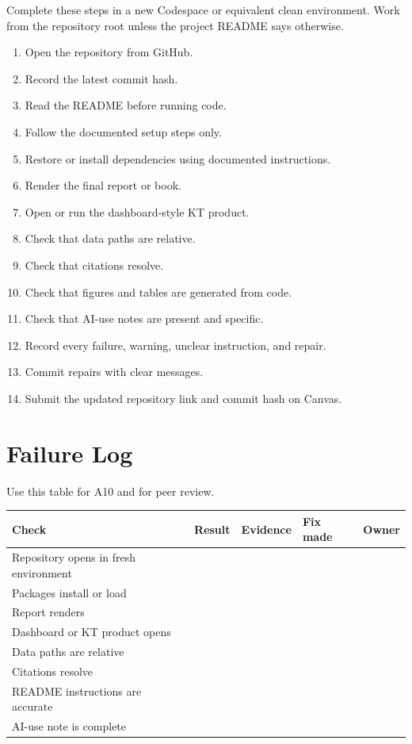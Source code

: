 \documentclass[
  letterpaper,
  DIV=11,
  numbers=noendperiod,
  oneside]{scrreprt}
\providecommand{\tightlist}{%
  \setlength{\itemsep}{0pt}\setlength{\parskip}{0pt}}
\begin{document}

Complete these steps in a new Codespace or equivalent clean environment.
Work from the repository root unless the project README says otherwise.

\begin{enumerate}
\def\labelenumi{\arabic{enumi}.}
\tightlist
\item
  Open the repository from GitHub.
\item
  Record the latest commit hash.
\item
  Read the README before running code.
\item
  Follow the documented setup steps only.
\item
  Restore or install dependencies using documented instructions.
\item
  Render the final report or book.
\item
  Open or run the dashboard-style KT product.
\item
  Check that data paths are relative.
\item
  Check that citations resolve.
\item
  Check that figures and tables are generated from code.
\item
  Check that AI-use notes are present and specific.
\item
  Record every failure, warning, unclear instruction, and repair.
\item
  Commit repairs with clear messages.
\item
  Submit the updated repository link and commit hash on Canvas.
\end{enumerate}

\section*{Failure Log}\label{failure-log}


Use this table for A10 and for peer review.

\begin{longtable}[]{@{}lllll@{}}
\toprule\noalign{}
Check & Result & Evidence & Fix made & Owner \\
\midrule\noalign{}
\endhead
\bottomrule\noalign{}
\endlastfoot
Repository opens in fresh environment & & & & \\
Packages install or load & & & & \\
Report renders & & & & \\
Dashboard or KT product opens & & & & \\
Data paths are relative & & & & \\
Citations resolve & & & & \\
README instructions are accurate & & & & \\
AI-use note is complete & & & & \\
\end{longtable}
\end{document}
